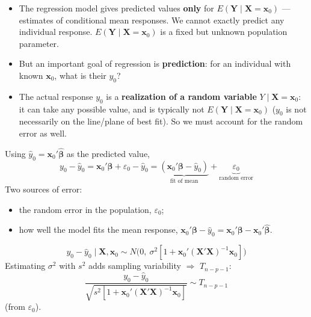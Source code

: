 \begin{remark}
    \begin{itemize}
        \item The regression model gives predicted values \textbf{only} for
        $E(\mathbf{Y}\mid\mathbf{X}=\mathbf{x}_0)$ --- estimates of conditional mean responses.
        We cannot exactly predict any individual response.
        $E(\mathbf{Y}\mid\mathbf{X}=\mathbf{x}_0)$ is a fixed but unknown population parameter.
        \item But an important goal of regression is \textbf{prediction}: for an individual
        with known $\mathbf{x}_0$, what is their $y_0$?
        \item The actual response $y_0$ is a \textbf{realization of a random variable}
        $Y\mid\mathbf{X}=\mathbf{x}_0$: it can take any possible value, and is typically
        not $E(\mathbf{Y}\mid\mathbf{X}=\mathbf{x}_0)$ ($y_0$ is not necessarily on the line/plane
        of best fit). So we must account for the random error as well.
    \end{itemize}
\end{remark}

\begin{definition}
    Using $\hat y_0=\mathbf{x}_0'\hat{\boldsymbol\beta}$ as the predicted value,
    \[\boxed{y_0-\hat y_0=\mathbf{x}_0'\boldsymbol\beta+\varepsilon_0-\hat y_0
    =\underbrace{(\mathbf{x}_0'\boldsymbol\beta-\hat y_0)}_{\text{fit of mean}}+\underbrace{\varepsilon_0}_{\text{random error}}}\]
    Two sources of error:
    \begin{itemize}
        \item the random error in the population, $\varepsilon_0$;
        \item how well the model fits the mean response,
        $\mathbf{x}_0'\boldsymbol\beta-\hat y_0=\mathbf{x}_0'\boldsymbol\beta-\mathbf{x}_0'\hat{\boldsymbol\beta}$.
    \end{itemize}
\end{definition}

\begin{proposition}
    \[\boxed{y_0-\hat y_0\mid\mathbf{X},\mathbf{x}_0\sim N\big(0,\ \sigma^2[1+\mathbf{x}_0'(\mathbf{X}'\mathbf{X})^{-1}\mathbf{x}_0]\big)}\]
    Estimating $\sigma^2$ with $s^2$ adds sampling variability $\Rightarrow$ $T_{n-p-1}$:
    \[\boxed{\frac{y_0-\hat y_0}{\sqrt{s^2[1+\mathbf{x}_0'(\mathbf{X}'\mathbf{X})^{-1}\mathbf{x}_0]}}\sim T_{n-p-1}}\]
     (from $\varepsilon_0$).
\end{proposition}

